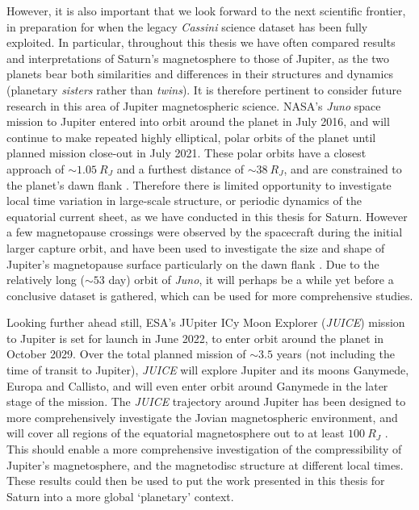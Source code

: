 However, it is also important that we look forward to the next scientific frontier, in preparation for when the legacy \textit{Cassini} science dataset has been fully exploited. In particular, throughout this thesis we have often compared results and interpretations of Saturn's magnetosphere to those of Jupiter, as the two planets bear both similarities and differences in their structures and dynamics (planetary \textit{sisters} rather than \textit{twins}). It is therefore pertinent to consider future research in this area of Jupiter magnetospheric science. NASA's \textit{Juno} space mission to Jupiter \citep{bolton2017} entered into orbit around the planet in July 2016, and will continue to make repeated highly elliptical, polar orbits of the planet until planned mission close-out in July 2021. These polar orbits have a closest approach of $\sim\SI{1.05}{R_J}$ and a furthest distance of $\sim\SI{38}{R_J}$, and are constrained to the planet's dawn flank \citep{bagenal2014}. Therefore there is limited opportunity to investigate local time variation in large-scale structure, or periodic dynamics of the equatorial current sheet, as we have conducted in this thesis for Saturn. However a few magnetopause crossings were observed by the spacecraft during the initial larger capture orbit, and have been used to investigate the size and shape of Jupiter's magnetopause surface particularly on the dawn flank \citep{gershman2017}. Due to the relatively long (${\sim}{53}$ day) orbit of \textit{Juno}, it will perhaps be  a while yet before a conclusive dataset is gathered, which can be used for more comprehensive studies. 

Looking further ahead still, ESA's JUpiter ICy Moon Explorer (\textit{JUICE}) mission to Jupiter \citep{grasset2013} is set for launch in June 2022, to enter orbit  around the planet in October 2029. Over the total planned mission of ${\sim}3.5$ years (not including the time of  transit to Jupiter), \textit{JUICE} will explore Jupiter and its moons Ganymede, Europa and Callisto, and will even enter orbit around Ganymede in the later stage of the mission. The \textit{JUICE} trajectory around Jupiter has been designed to more comprehensively investigate the Jovian magnetospheric environment, and will cover all regions of the equatorial magnetosphere out to at least $\SI{100}{R_J}$ \citep{esa2014}. This should enable a more comprehensive investigation of the compressibility of Jupiter's magnetosphere, and the magnetodisc structure at different local times. These results could then be used to put the work presented in this thesis for Saturn into a more global `planetary' context.
%
%
%
%
%
%
%
%
%
%
%
%
%
%
%
%
%
%
%
%
%
%
%
%
%
%
%